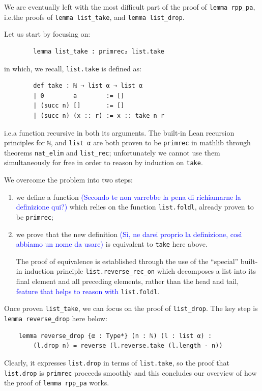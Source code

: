 \documentclass[preprint]{elsarticle}
\theoremstyle{remark}
\newcommand{\MATHLIB}{\textsf{mathlib}\xspace}
\newcommand{\LEAN}{\textsf{Lean}\xspace}
\begin{document}
We are eventually left with the most difficult part of the proof of \lstinline|lemma rpp_pa|, i.e.\@ the proofs of \lstinline|lemma list_take|, and \lstinline|lemma list_drop|.

\vspace{\baselineskip}
\noindent
Let us start by focusing on:
\begin{lstlisting}
        lemma list_take : primrec₂ list.take
\end{lstlisting}
\noindent
in which, we recall, \lstinline|list.take| is defined as:
\begin{lstlisting}
        def take : ℕ → list α → list α
        | 0        a        := []
        | (succ n) []       := []
        | (succ n) (x :: r) := x :: take n r
\end{lstlisting}
\noindent
i.e.\@ a function recursive in both its arguments. The built-in \LEAN recursion principles for \lstinline|ℕ|, and \lstinline|list α| are both proven to be \lstinline|primrec| in \MATHLIB through theorems \lstinline|nat_elim| and \lstinline|list_rec|; unfortunately we cannot use them simultaneously for free in order to reason by induction on \lstinline|take|.

\vspace{\baselineskip}
\noindent
We overcome the problem into two steps:
\begin{enumerate}
    \item we define a function \textcolor{blue}{(Secondo te non varrebbe la pena di richiamarne la definizione qui?)} which relies on the function \lstinline|list.foldl|, already proven to be \lstinline|primrec|;

    \item we prove that the new definition \textcolor{blue}{(Sì, ne darei proprio la definizione, così abbiamo un nome da usare)} is equivalent to \lstinline|take| here above.

    The proof of equivalence is established through the use of the ``special'' built-in induction principle \lstinline|list.reverse_rec_on| which decomposes a list into its final element and all preceding elements, rather than the head and tail, \textcolor{blue}{feature that helps to reason with} \lstinline|list.foldl|.
\end{enumerate}

\vspace{\baselineskip}
\noindent
Once proven \lstinline|list_take|, we can focus on the proof of \lstinline|list_drop|.
The key step is \lstinline|lemma reverse_drop| here below:
\begin{lstlisting}
    lemma reverse_drop {α : Type*} (n : ℕ) (l : list α) :
        (l.drop n) = reverse (l.reverse.take (l.length - n))
\end{lstlisting}
\noindent
Clearly, it expresses \lstinline|list.drop| in terms of \lstinline|list.take|, so the proof that \lstinline|list.drop| is \lstinline|primrec| proceeds smoothly and this concludes our overview of how the proof of \lstinline|lemma rpp_pa| works.
\end{document}
